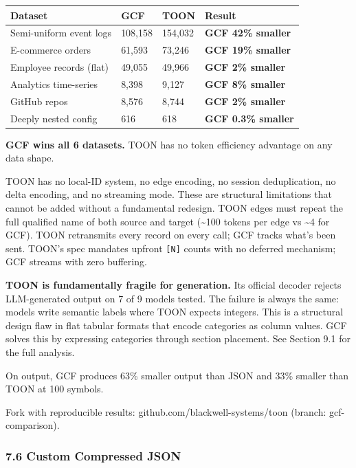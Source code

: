 \documentclass[
  11pt,
  paper=a4,
  ,captions=tableheading
]{scrartcl}
\newcounter{none} %
\begin{document}
{\def\LTcaptype{none} %
\begin{longtable}[]{@{}llll@{}}
\toprule\noalign{}
Dataset & GCF & TOON & Result \\
\midrule\noalign{}
\endhead
\bottomrule\noalign{}
\endlastfoot
Semi-uniform event logs & 108,158 & 154,032 & \textbf{GCF 42\%
smaller} \\
E-commerce orders & 61,593 & 73,246 & \textbf{GCF 19\% smaller} \\
Employee records (flat) & 49,055 & 49,966 & \textbf{GCF 2\% smaller} \\
Analytics time-series & 8,398 & 9,127 & \textbf{GCF 8\% smaller} \\
GitHub repos & 8,576 & 8,744 & \textbf{GCF 2\% smaller} \\
Deeply nested config & 616 & 618 & \textbf{GCF 0.3\% smaller} \\
\end{longtable}
}

\textbf{GCF wins all 6 datasets.} TOON has no token efficiency advantage
on any data shape.

TOON has no local-ID system, no edge encoding, no session deduplication,
no delta encoding, and no streaming mode. These are structural
limitations that cannot be added without a fundamental redesign. TOON
edges must repeat the full qualified name of both source and target
(\textasciitilde100 tokens per edge vs \textasciitilde4 for GCF). TOON
retransmits every record on every call; GCF tracks what's been sent.
TOON's spec mandates upfront \texttt{{[}N{]}} counts with no deferred
mechanism; GCF streams with zero buffering.

\textbf{TOON is fundamentally fragile for generation.} Its official
decoder rejects LLM-generated output on 7 of 9 models tested. The
failure is always the same: models write semantic labels where TOON
expects integers. This is a structural design flaw in flat tabular
formats that encode categories as column values. GCF solves this by
expressing categories through section placement. See Section 9.1 for the
full analysis.

On output, GCF produces 63\% smaller output than JSON and 33\% smaller
than TOON at 100 symbols.

Fork with reproducible results: github.com/blackwell-systems/toon
(branch: gcf-comparison).

\subsubsection{7.6 Custom Compressed JSON}\label{custom-compressed-json}
\end{document}
